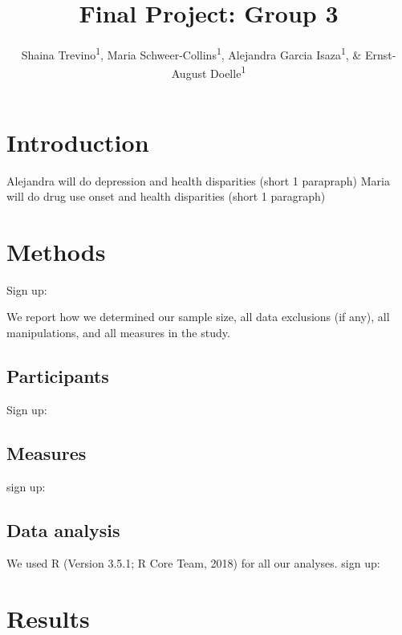\documentclass[man]{apa6}
\title{Final Project: Group 3}
\author{Shaina Trevino\textsuperscript{1}, Maria
Schweer-Collins\textsuperscript{1}, Alejandra Garcia
Isaza\textsuperscript{1}, \& Ernst-August Doelle\textsuperscript{1}}
\date{}
\affiliation{
\vspace{0.5cm}
\textsuperscript{1} University of Oregon}
\begin{document}
\maketitle

\section{Introduction}\label{introduction}

Alejandra will do depression and health disparities (short 1 parapraph)
Maria will do drug use onset and health disparities (short 1 paragraph)

\section{Methods}\label{methods}

Sign up:

We report how we determined our sample size, all data exclusions (if
any), all manipulations, and all measures in the study.

\subsection{Participants}\label{participants}

Sign up:

\subsection{Measures}\label{measures}

sign up:

\subsection{Data analysis}\label{data-analysis}

We used R (Version 3.5.1; R Core Team, 2018) for all our analyses. sign
up:

\section{Results}\label{results}
\end{document}
